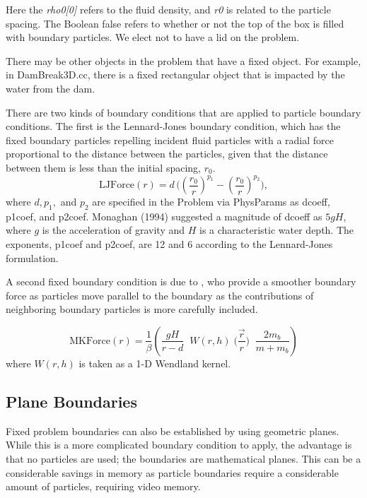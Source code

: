 \documentclass[12pt]{memoir}
\newcommand{\be}{\begin{equation}}
\newcommand{\en}{\end{equation}}
\begin{document}
Here the {\em rho0[0]} refers to the fluid density, and {\em r0} is
related to the particle spacing. The Boolean false refers to whether or
not the top of the box is filled with boundary particles. We elect not
to have a lid on the problem.

There may be other objects in the problem that have a fixed object. For
example, in DamBreak3D.cc, there is a fixed rectangular object that is
impacted by the water from the dam.

There are two kinds of boundary conditions that are applied to particle
boundary conditions. The first is the Lennard-Jones boundary condition,
which has the fixed boundary particles repelling incident fluid
particles with a radial force proportional to the distance between the
particles, given that the distance between them is less than the initial
spacing, $r_0$. \be \mbox{LJForce}(r) = d \, \Big( (
\frac{r_0}{r})^{p_1} - (\frac{r_0}{r})^{p_2}\Big), \en where $d, p_1,$
and $p_2$ are specified in the Problem via PhysParams as dcoeff,
p1coef, and p2coef. Monaghan (1994) suggested a magnitude of dcoeff as
$5 g H$, where $g$ is the acceleration of gravity and $H$ is a
characteristic water depth. The exponents, p1coef and p2coef, are 12
and 6 according to the Lennard-Jones formulation.

A second fixed boundary condition is due to \citet{MonaghanBC:2009}, who
provide a smoother boundary force as particles move parallel to the
boundary as the contributions of neighboring boundary particles is more
carefully included.

\be \mbox{MKForce}(r) = \frac{1}{\beta} \left( \frac{g H}{r-d}\;\;W(r,h)
\; \Big(\frac{\vec{r}}{r}\Big)\; \;\frac{2 m_b}{m + m_b}\right) \en
where $W(r,h)$ is taken as a 1-D Wendland kernel.

\subsection{Plane Boundaries}

Fixed problem boundaries can also be established by using geometric
planes. While this is a more complicated boundary condition to apply,
the advantage is that no particles are used; the boundaries are
mathematical planes. This can be a considerable savings in memory as
particle boundaries require a considerable amount of particles,
requiring video memory.
\end{document}
